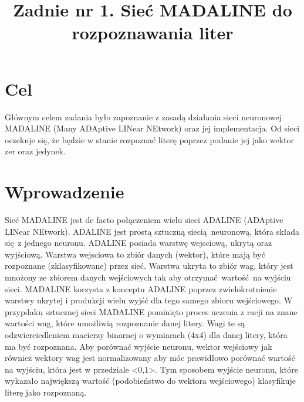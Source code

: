 \documentclass{classrep}
\author{
  \studentinfo{Szymon Łyszkowski}{206809}\and
  \studentinfo{Piotr Kluch}{206799}
}
\title{Zadnie nr 1. Sieć MADALINE do rozpoznawania liter}
\begin{document}
\maketitle

\section{Cel}
{
Głównym celem zadania było zapoznanie z zasadą działania sieci neuronowej MADALINE (Many ADAptive LINear NEtwork) oraz jej implementacja. Od sieci oczekuje się, że będzie w stanie rozpoznać literę poprzez podanie jej jako wektor zer oraz jedynek.}

\section{Wprowadzenie}
{Sieć MADALINE jest de facto połączeniem wielu sieci ADALINE (ADAptive LINear NEtwork). ADALINE jest prostą sztuczną siecią neuronową, która składa się z jednego neuronu. ADALINE posiada warstwę wejsciową, ukrytą oraz wyjściową. Warstwa wejsciowa to zbiór danych (wektor), które mają być rozpoznane (zklasyfikowane) przez sieć. Warstwa ukryta to zbiór wag, który jest mnożony ze zbiorem danych wejściowych tak aby otrzymać wartość na wyjściu sieci. MADALINE korzysta z konceptu ADALINE poprzez zwielokrotnienie warstwy ukrytej i produkcji wielu wyjść dla tego samego zbioru wejściowego.
W przypdaku sztucznej sieci MADALINE pominięto proces uczenia z racji na znane wartości wag, które umożliwią rozpoznanie danej litery. Wagi te są odzwierciedleniem macierzy binarnej o wymiarach (4x4) dla danej litery, która ma być rozpoznana. Aby porównać wyjście neuronu, wektor wejściowy jak również wektory wag jest normalizowany aby móc prawidłowo porównać wartość na wyjściu, która jest w przedziale <0,1>. Tym sposobem wyjście neuronu, które wykazało największą wartość (podobieństwo do wektora wejściowego) klasyfikuje literę jako rozpoznaną.
}
\end{document}
